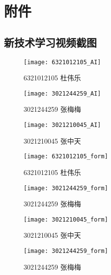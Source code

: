 \chapter{附件}
\section{新技术学习视频截图}
\begin{figure}[htbp]
    \centering
    \texttt{[image: 6321012105\_AI]}
    \caption{6321012105 杜伟乐}\label{fig:6321012105_AI}
    \vspace{\baselineskip}
\end{figure}
\begin{figure}[htbp]
    \centering
    \texttt{[image: 3021244259\_AI]}
    \caption{3021244259 张梅梅}\label{fig:3021244259_AI}
    \vspace{\baselineskip}
\end{figure}
\begin{figure}[htbp]
    \centering
    \texttt{[image: 3021210045\_AI]}
    \caption{3021210045 张中天}\label{fig:3021210045_AI}
    \vspace{\baselineskip}
\end{figure}
\begin{figure}[htbp]
    \centering
    \begin{minipage}{0.4\textwidth}
        \centering
        \texttt{[image: 6321012105\_form]}
        \caption{6321012105 杜伟乐}\label{fig:6321012105_form}
    \end{minipage}
    \begin{minipage}{0.4\textwidth}
        \centering
        \texttt{[image: 3021244259\_form]}
        \caption{3021244259 张梅梅}\label{fig:3021244259_form}
    \end{minipage}
\end{figure}
\begin{figure}[htbp]
    \centering
    \begin{minipage}{0.4\textwidth}
        \centering
        \texttt{[image: 3021210045\_form]}
        \caption{3021210045 张中天}\label{fig:3021210045_form}
    \end{minipage}
    \begin{minipage}{0.4\textwidth}
        \centering
        \texttt{[image: 3021244259\_form]}
        \caption{3021244259 张梅梅}\label{fig:3021244259_form}
    \end{minipage}
\end{figure}